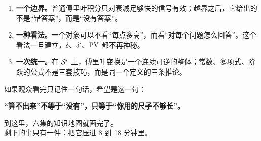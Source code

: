 \begin{ideabox}[三句话]
\begin{enumerate}[leftmargin=1.6em,itemsep=0.35em]
\item \textbf{一个边界。}普通傅里叶积分只对衰减足够快的信号有效；越界之后，它给出的不是“错答案”，而是“没有答案”。
\item \textbf{一种看法。}一个对象可以不看“每点多高”，而看“对每个问题怎么回答”。这个看法一旦建立，$\delta$、$\delta'$、$\operatorname{PV}$ 都不再神秘。
\item \textbf{一次统一。}在 $\mathcal{S}'$ 上，傅里叶变换是一个连续可逆的整体；常数、多项式、阶跃的公式不是三套技巧，而是同一个定义的三条推论。
\end{enumerate}

如果观众看完只记住一句话，希望是这一句：

\begin{center}
\textbf{“算不出来”不等于“没有”，只等于“你用的尺子不够长”。}
\end{center}
\end{ideabox}

\vspace{0.6cm}
\begin{center}
\begin{tcolorbox}[colback=softblue,colframe=mainblue!45,boxrule=0pt,arc=2pt,width=0.90\textwidth]
\centering
\vspace{0.25em}
{\small\color{notegray} 到这里，六集的知识地图就画完了。}\\[0.45em]
{\normalsize 剩下的事只有一件：把它压进 8 到 18 分钟里。}
\vspace{0.25em}
\end{tcolorbox}
\end{center}

